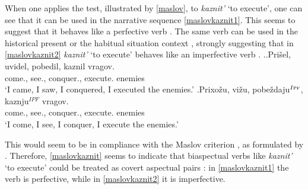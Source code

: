 When one applies the test, illustrated by \ref{maslov}, to \textit{kaznit'} `to execute', one can see that it can be used in the narrative sequence   \ref{maslovkaznit1}. This seems to suggest that it behaves like a perfective verb . The same verb can be used in the historical present  or the habitual situation  context  , strongly suggesting that in \ref{maslovkaznit2} \textit{kaznit'} `to execute' behaves like an imperfective verb .
\ex.\label{maslovkaznit}\ag.\label{maslovkaznit1}Pri\v{s}el\textsuperscript{\PF}, uvidel\textsuperscript{\PF}, pobedil\textsuperscript{\PF}, kaznil\textsuperscript{\PF} vragov.\\
come., see., conquer., execute. enemies\\
\trans `I came, I saw, I conquered, I executed the enemies.'
\bg.\label{maslovkaznit2}Prixo\v{z}u\textsuperscript{\IPF}, vi\v{z}u\textsuperscript{\IPF}, pobe\v{z}daju$^{I{\textsc{pf}}}$, kaznju$^{IPF}$ vragov.\\
come., see., conquer., execute. enemies\\
\trans `I come, I see, I conquer, I execute the enemies.'

This would seem to be in compliance with the Maslov criterion , as formulated by \citet{Mikaelian:07}. Therefore, \ref{maslovkaznit} seems to indicate that biaspectual verbs  like \textit{kaznit'} `to execute' could be treated as covert aspectual pairs : in \ref{maslovkaznit1} the verb is perfective, while in \ref{maslovkaznit2} it is imperfective.


